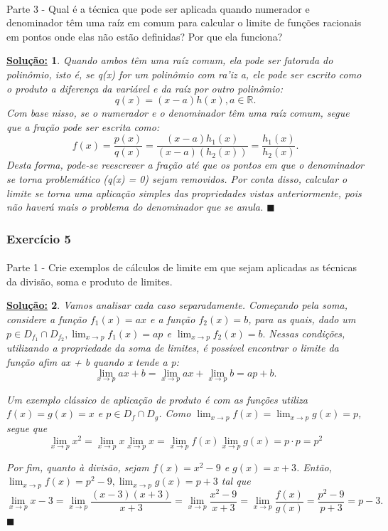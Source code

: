 \documentclass{article}
\newtheorem*{sol*}{\underline{Solu\c c\~ao:}}
\renewcommand\qedsymbol{$\blacksquare$}
\begin{document}
\paragraph{} Parte 3 - Qual \'e a t\'ecnica que pode ser aplicada quando numerador e denominador t\^em uma ra\'iz em comum para calcular o limite de fun\c c\~oes racionais em pontos onde elas n\~ao est\~ao definidas? Por que ela funciona?
\begin{sol*}
	Quando ambos t\^em uma ra\'iz comum, ela pode ser fatorada do polin\^omio, isto \'e, se q(x) for um polin\^omio com ra'iz a, ele pode ser escrito como o produto a diferen\c ca da vari\'avel e da ra\'iz por outro polin\^omio:
	$$
		q(x) = (x - a)h(x), a\in\mathbb{R}.
	$$
	Com base nisso, se o numerador e o denominador t\^em uma ra\'iz comum, segue que a fra\c c\~ao pode ser escrita como:
	$$
		f(x) = \frac{p(x)}{q(x)} = \frac{(x-a)h_1(x)}{(x-a)(h_2(x))} = \frac{h_1(x)}{h_2(x)}.
	$$
	Desta forma, pode-se reescrever a fra\c c\~ao at\'e que os pontos em que o denominador se torna problem\'atico (q(x) = 0) sejam removidos. Por conta disso, calcular o limite se torna uma aplica\c c\~ao simples das propriedades vistas anteriormente, pois n\~ao haver\'a mais o problema do denominador que se anula.
	\qedsymbol
\end{sol*}

\subsubsection{Exerc\'icio 5}
\paragraph{} Parte 1 - Crie exemplos de c\'alculos de limite em que sejam aplicadas as t\'ecnicas da divis\~ao, soma e produto de limites.
\begin{sol*}
	Vamos analisar cada caso separadamente.
	Come\c cando pela soma, considere a fun\c c\~ao $f_1(x) = ax$ e a fun\c c\~ao $f_2(x) = b$, para as quais, dado um $p\in{D_{f_1}}\cap{D_{f_2}}, \lim_{x\to{p}}f_1(x) = ap$ e $\lim_{x\to{p}}f_2(x) = b.$ Nessas condi\c c\~oes, utilizando a propriedade da soma de limites, \'e poss\'ivel encontrar o limite da fun\c c\~ao afim ax + b quando x tende a p:
	$$
		\lim_{x\to{p}}ax + b = \lim_{x\to{p}}ax + \lim_{x\to{p}}b = ap + b.
	$$

	Um exemplo cl\'assico de aplica\c c\~ao de produto \'e com as fun\c c\~oes utiliza $f(x) = g(x) = x$ e $p\in{D_f\cap D_g}$. Como $\lim_{x\to{p}}f(x) = \lim_{x\to{p}} g(x) = p$, segue que
	$$
		\lim_{x\to{p}}x^2 = \lim_{x\to{p}}x\lim_{x\to{p}}x = \lim_{x\to{p}}f(x)\lim_{x\to{p}}g(x) = p\cdot{p} = p^2
	$$

	Por fim, quanto \`a divis\~ao, sejam $f(x) = x^2 - 9$ e $g(x) = x + 3$. Ent\~ao, $\lim_{x\to{p}}f(x) = p^2 - 9, \lim_{x\to{p}}g(x) = p + 3$
	tal que
	$$
		\lim_{x\to{p}}x - 3 = \lim_{x\to{p}}\frac{(x - 3)(x + 3)}{x + 3} = \lim_{x\to{p}}\frac{x^2 - 9}{x + 3} = \lim_{x\to{p}}\frac{f(x)}{g(x)} = \frac{p^2 - 9}{p + 3} = p - 3.
	$$
	\qedsymbol
\end{sol*}
\end{document}
